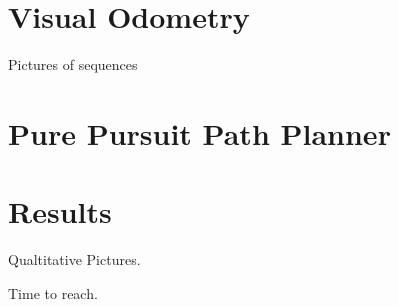 \section{Visual Odometry}
Pictures of sequences

\section{Pure Pursuit Path Planner}

\section{Results}
Qualtitative Pictures.

Time to reach.

% 
% 
